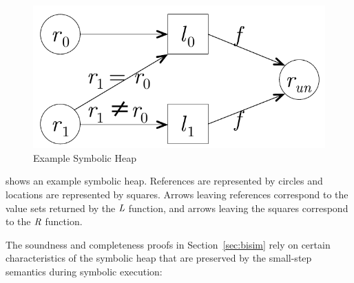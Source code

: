 \begin{figure}[t]
\begin{center}
\includegraphics[scale=0.5]{../figs/simple_heap_scratch.pdf}
\end{center}
\caption{Example Symbolic Heap}
\label{fig:exampleHeap}
\end{figure}

 shows an example symbolic heap. References are 
represented by circles and locations are represented by squares. Arrows leaving
references correspond to the value sets returned by the $\emph{L}$ function, and 
arrows leaving the squares correspond to the $\emph{R}$ function.

The soundness and completeness proofs in Section~\ref{sec:bisim} rely
on certain characteristics of the symbolic heap that are preserved by
the small-step semantics during symbolic execution:

